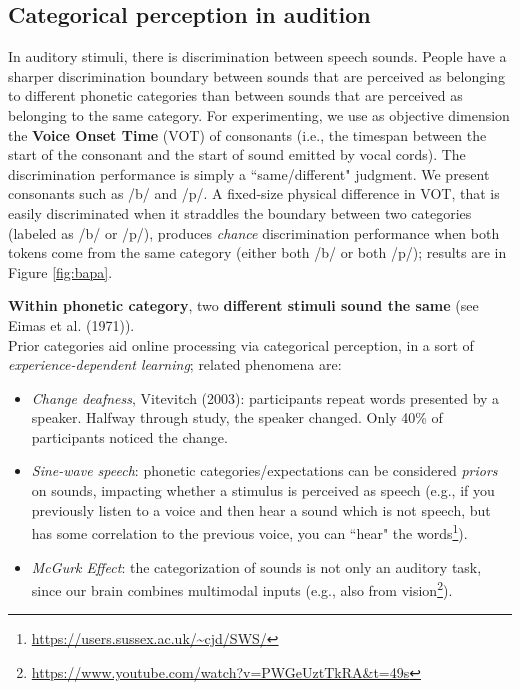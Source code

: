 \subsection{Categorical perception in audition}
In auditory stimuli, there is discrimination between speech sounds. People have a sharper discrimination boundary between sounds that are perceived as belonging to different phonetic categories than between sounds that are perceived as belonging to the same category.
For experimenting, we use as objective dimension the \textbf{Voice Onset Time} (VOT) of consonants (i.e., the timespan between the start of the consonant and the start of sound emitted by vocal cords). The discrimination performance is simply a ``same/different" judgment. We present consonants such as /b/ and /p/. A fixed-size physical difference in VOT, that is easily discriminated when it straddles the boundary between two categories (labeled as /b/ or /p/), produces \textit{chance} discrimination performance when both tokens come from the same category (either both /b/ or both /p/); results are in Figure \ref{fig:bapa}.

\textbf{Within phonetic category}, two \textbf{different stimuli sound the same} (see \notedv Eimas et al. (1971)).\\

Prior categories aid online processing via categorical perception, in a sort of \textit{experience-dependent learning}; related phenomena are:
\begin{itemize}
    \item \textit{Change deafness}, Vitevitch (2003): participants repeat words presented by a speaker. Halfway through study, the speaker changed. Only 40\% of participants noticed the change.
    \item \textit{Sine-wave speech}: phonetic categories/expectations can be considered \textit{priors} on sounds, impacting whether a stimulus is perceived as speech (e.g., if you previously listen to a voice and then hear a sound which is not speech, but has some correlation to the previous voice, you can ``hear" the words\footnote{\url{https://users.sussex.ac.uk/~cjd/SWS/}}).
    \item \textit{McGurk Effect}: the categorization of sounds is not only an auditory task, since our brain combines multimodal inputs (e.g., also from vision\footnote{\url{https://www.youtube.com/watch?v=PWGeUztTkRA&t=49s}}).
\end{itemize}

